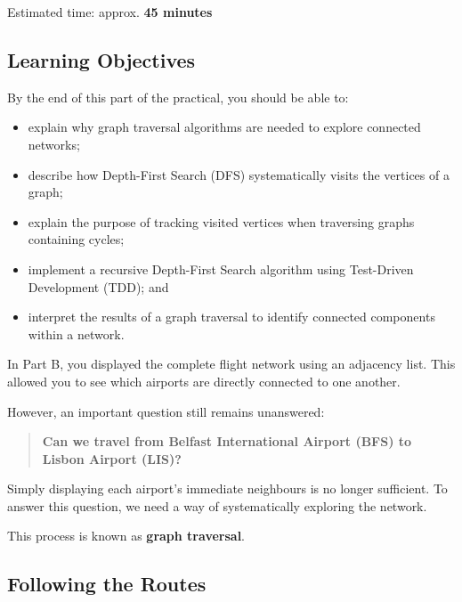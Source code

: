 \documentclass{csc2059practical}
\begin{document}
\begin{infobox}
Estimated time: approx. \textbf{45 minutes}
\end{infobox}

\subsection*{Learning Objectives}

By the end of this part of the practical, you should be able to:

\begin{itemize}
    \item explain why graph traversal algorithms are needed to explore connected networks;
    \item describe how Depth-First Search (DFS) systematically visits the vertices of a graph;
    \item explain the purpose of tracking visited vertices when traversing graphs containing cycles;
    \item implement a recursive Depth-First Search algorithm using Test-Driven Development (TDD); and
    \item interpret the results of a graph traversal to identify connected components within a network.
\end{itemize}

In Part B, you displayed the complete flight network using an adjacency list. This allowed you to see which airports are directly connected to one another.

However, an important question still remains unanswered:

\begin{quote}
\textbf{Can we travel from Belfast International Airport (BFS) to Lisbon Airport (LIS)?}
\end{quote}

Simply displaying each airport's immediate neighbours is no longer sufficient. To answer this question, we need a way of systematically exploring the network.

This process is known as \textbf{graph traversal}.

\subsection{Following the Routes}
\end{document}
